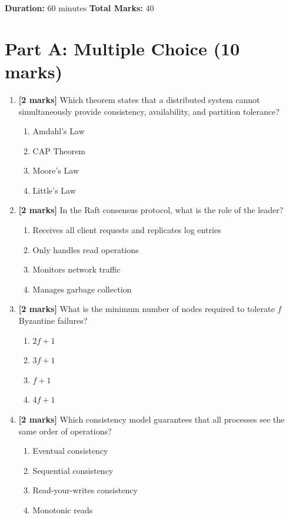 \documentclass[
    language=english,
    doctype=quiz,
    institution=none,
]{../../omnilatex}
\begin{document}
\maketitle

\noindent\textbf{Duration:} 60 minutes \hfill \textbf{Total Marks:} 40

\section*{Part A: Multiple Choice (10 marks)}

\begin{enumerate}
    \item \textbf{[2 marks]} Which theorem states that a distributed system
      cannot simultaneously provide consistency, availability, and partition
      tolerance?
    \begin{enumerate}[label=\Alph*.]
        \item Amdahl's Law
        \item CAP Theorem
        \item Moore's Law
        \item Little's Law
    \end{enumerate}

    \item \textbf{[2 marks]} In the Raft consensus protocol, what is the
      role of the leader?
    \begin{enumerate}[label=\Alph*.]
        \item Receives all client requests and replicates log entries
        \item Only handles read operations
        \item Monitors network traffic
        \item Manages garbage collection
    \end{enumerate}

    \item \textbf{[2 marks]} What is the minimum number of nodes required
      to tolerate $f$ Byzantine failures?
    \begin{enumerate}[label=\Alph*.]
        \item $2f + 1$
        \item $3f + 1$
        \item $f + 1$
        \item $4f + 1$
    \end{enumerate}

    \item \textbf{[2 marks]} Which consistency model guarantees that all
      processes see the same order of operations?
    \begin{enumerate}[label=\Alph*.]
        \item Eventual consistency
        \item Sequential consistency
        \item Read-your-writes consistency
        \item Monotonic reads
    \end{enumerate}


\end{enumerate}
\end{document}
